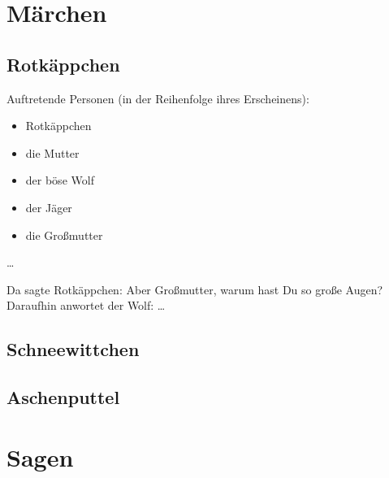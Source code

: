 \documentclass[a4paper,12pt,twoside]{article}
\begin{document}
\tableofcontents
\section{M\"archen}
\subsection{Rotk\"appchen}
Auftretende Personen (in der Reihenfolge ihres Erscheinens):
\begin{itemize}
\item Rotk\"appchen
\item die Mutter
\item der b\"ose Wolf
\item der J\"ager
\item die Gro{\ss}mutter
\end{itemize}
\dots

Da sagte Rotk\"appchen: \glqq Aber Gro{\ss}mutter, warum hast Du so
gro{\ss}e Augen?\grqq{} Daraufhin anwortet der Wolf: \dots
\subsection{Schneewittchen}
\subsection{Aschenputtel}
\section{Sagen}
\end{document}
